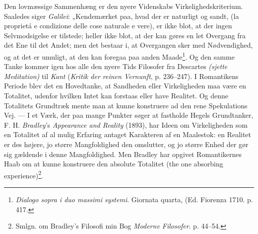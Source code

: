 \documentclass[12pt,a4paper]{book}
\newcommand{\apage}[1]{\marginnote{\footnotesize\textit{[#1]}}}
\begin{document}
Den lovmæssige Sammenhæng er den nyere Videnskabs Virkelighedskriterium.
Saaledes siger \emph{Galilei}: „Kendemærket \apage{105} paa, hvad der er naturligt og
sandt, (la proprietá e condizione delle cose naturale e vere), er ikke
blot, at der ingen Selvmodsigelse er tilstede; heller ikke blot, at der
kan gøres en let Overgang fra det Ene til det Andet; men det bestaar i,
at Overgangen sker med Nødvendighed, og at det er umuligt, at den kan
foregaa paa anden Maade\footnote{\emph{Dialogo sopra i duo massimi
systemi}. Giornata quarta, (Ed. Fiorenza 1710. p. 417.}. Og den samme
Tanke kommer igen hos alle den nyere Tids Filosofer fra Descartes
\emph{(sjette Meditation)} til \emph{Kant} (\emph{Kritik der reinen
Vernunft}, p. 236--247). I Romantikens Periode blev det en Hovedtanke,
at Sandheden eller Virkeligheden maa være en Totalitet, udenfor hvilken
Intet kan forstaas eller have Realitet. Og denne Totalitets Grundtræk
mente man at kunne konstruere ad den rene Spekulations Vej. --- I et
Værk, der paa mange Punkter søger at fastholde Hegels Grundtanker, F. H.
\emph{Bradley}'s \emph{Appearance and Reality} (1893), har Ideen om
Virkeligheden som en Totalitet af al mulig Erfaring antaget Karakteren
af en Maalestok: en Realitet er des højere, jo større Mangfoldighed den
omslutter, og jo større Enhed der gør sig gældende i denne
Mangfoldighed. Men Bradley har opgivet Romantikernes Haab om at kunne
konstruere den absolute Totalitet (the one absorbing
experience)\footnote{Smlgn. om Bradley's Filosofi min Bog \emph{Moderne
Filosofer}. p. 44--54.}.
\end{document}
